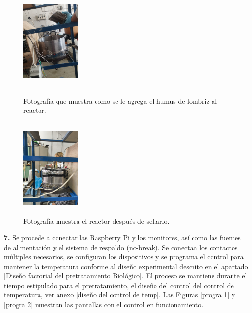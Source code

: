 \documentclass[12pt]{article}
\begin{document}
	\begin{figure}[H]
		\centering
		\begin{minipage}{0.46\textwidth}
			\centering
			\includegraphics[width=3cm, height=5cm]{imagenes/humus2} %
			\caption{Fotografía que muestra como se le agrega el humus de lombriz al reactor.}
				\label{humus2}
			\end{minipage}
			\hfill
			\begin{minipage}{0.48\textwidth}
				\centering
				\includegraphics[width=3cm, height=5cm]{imagenes/cellado del reactor} %
				\caption{Fotografía muestra el reactor después de sellarlo.}
				\label{cellado del reactor}
			\end{minipage}
		\end{figure}
		
			
			\textbf{7. } Se procede a conectar las Raspberry Pi y los monitores, así como las fuentes de alimentación y el sistema de respaldo (no-break). Se conectan los contactos múltiples necesarios, se configuran los dispositivos y se programa el control para mantener la temperatura conforme al diseño experimental descrito en el apartado \ref{Diseño factorial del pretratamiento Biológico}. El proceso se mantiene durante el tiempo estipulado para el pretratamiento, el diseño del control del control de temperatura, ver anexo \ref{diseño del control de temp}. Las Figuras \ref{progra 1} y \ref{progra 2} muestran las pantallas con el control en funcionamiento.
			
\end{document}
